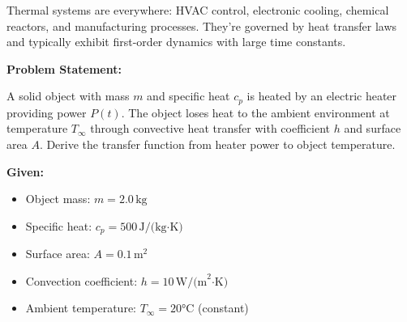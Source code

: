 \begin{example}
\label{ex:thermal_system}

Thermal systems are everywhere: HVAC control, electronic cooling, chemical reactors, and manufacturing processes. They're governed by heat transfer laws and typically exhibit first-order dynamics with large time constants.

\textbf{Problem Statement:}

A solid object with mass $m$ and specific heat $c_p$ is heated by an electric heater providing power $P(t)$. The object loses heat to the ambient environment at temperature $T_\infty$ through convective heat transfer with coefficient $h$ and surface area $A$. Derive the transfer function from heater power to object temperature.

\begin{center}
\end{center}

\textbf{Given:}
\begin{itemize}
    \item Object mass: $m = 2.0\,\text{kg}$
    \item Specific heat: $c_p = 500\,\text{J/(kg·K)}$
    \item Surface area: $A = 0.1\,\text{m}^2$
    \item Convection coefficient: $h = 10\,\text{W/(m}^2\text{·K)}$
    \item Ambient temperature: $T_\infty = 20°\text{C}$ (constant)
\end{itemize}


\end{example}

